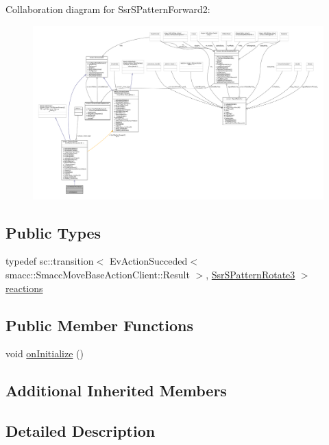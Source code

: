 Collaboration diagram for Ssr\+S\+Pattern\+Forward2\+:
\nopagebreak
\begin{figure}[H]
\begin{center}
\leavevmode
\includegraphics[width=350pt]{structSsrSPatternForward2__coll__graph}
\end{center}
\end{figure}
\subsection*{Public Types}
\begin{DoxyCompactItemize}
\item 
typedef sc\+::transition$<$ Ev\+Action\+Succeded$<$ smacc\+::\+Smacc\+Move\+Base\+Action\+Client\+::\+Result $>$, \hyperlink{structSsrSPatternRotate3}{Ssr\+S\+Pattern\+Rotate3} $>$ \hyperlink{structSsrSPatternForward2_ae0b2587842b76280c12b12dff3a1b5f8}{reactions}
\end{DoxyCompactItemize}
\subsection*{Public Member Functions}
\begin{DoxyCompactItemize}
\item 
void \hyperlink{structSsrSPatternForward2_a9271aa70005c791d87e03a2b1c02900a}{on\+Initialize} ()
\end{DoxyCompactItemize}
\subsection*{Additional Inherited Members}


\subsection{Detailed Description}


